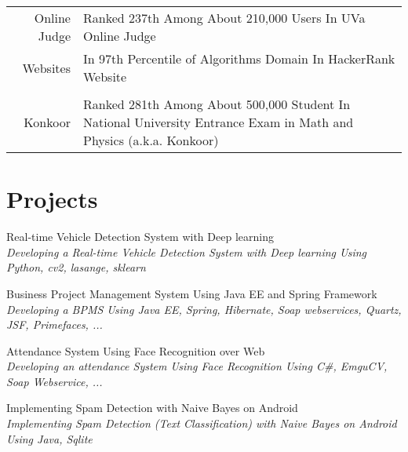 \documentclass[a4paper,10pt]{article}
\begin{document}
\begin{tabular}{r|p{11cm}}
			\textnormal{Online Judge} & {\small Ranked 237th Among About 210,000 Users In UVa Online Judge}
			\href{https://uva.onlinejudge.org/index.php?option=com_onlinejudge&Itemid=20&page=show_authorsrank&limit=50&limitstart=200}{\footnotesize \faExternalLink} \\
			
			\textnormal{Websites} & {\small In 97th Percentile of Algorithms Domain In HackerRank Website}
			\href{https://www.hackerrank.com/imn_irdst}{\footnotesize \faExternalLink} \\
			 \\
			
			\textnormal{Konkoor} & {\small Ranked 281th Among About 500,000 Student In National University Entrance Exam in Math and Physics (a.k.a. Konkoor)}\\
		\end{tabular}
	\section{Projects}
		\textbullet\textnormal{ Real-time Vehicle Detection System with Deep learning} \\
		\emph{\color{darkgray}\small {\space\space\space}Developing a Real-time Vehicle Detection System with Deep learning Using Python, cv2, lasange, sklearn} \vspace{1 mm} 
		
		\textbullet\textnormal{ Business Project Management System Using Java EE and Spring Framework} \\
		\emph{\color{darkgray}\small {\space\space\space}Developing a BPMS Using Java EE, Spring, Hibernate, Soap webservices, Quartz, JSF, Primefaces, ...} \vspace{1 mm}
		
		\textbullet\textnormal{ Attendance System Using Face Recognition over Web} \\
		\emph{\color{darkgray}\small {\space\space\space}Developing an attendance System Using Face Recognition Using C\#, EmguCV, Soap Webservice, ...} \vspace{1 mm}
		
		\textbullet\textnormal{ Implementing Spam Detection with Naive Bayes on Android} \\
		\emph{\color{darkgray}\small {\space\space\space}Implementing Spam Detection (Text Classification) with Naive Bayes on Android Using Java, Sqlite} \vspace{1 mm}
		
\end{document}
